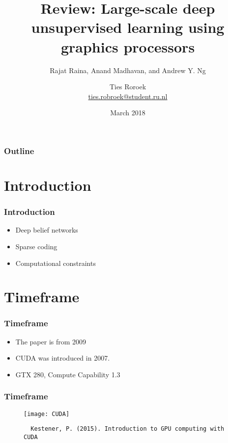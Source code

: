 \documentclass{beamer}
\title[Deep learning using graphics processors]{
  Review: Large-scale deep unsupervised learning using graphics processors}
\subtitle{Rajat Raina, Anand Madhavan, and Andrew Y. Ng}
\author[Ties Robroek]{
  Ties Roroek \\\medskip
  {\small \url{ties.robroek@student.ru.nl}}}
\institute[Radboud University Nijmegen]{
  Institute for Computing and Information Sciences \\
  Radboud University Nijmegen}
\date[March 2018]{
  March 2018}
\begin{document}
\begin{frame}
  \titlepage
\end{frame}

\begin{frame}
  \frametitle{Outline}

  \tableofcontents
\end{frame}

\section{Introduction}

\begin{frame}
  \frametitle{Introduction}

  \begin{itemize}
    \item Deep belief networks
    \item Sparse coding
    \item Computational constraints
  \end{itemize}
\end{frame}

\section{Timeframe}

\begin{frame}
  \frametitle{Timeframe}

  \begin{itemize}
    \item The paper is from 2009
    \item CUDA was introduced in 2007.
    \item GTX 280, Compute Capability 1.3
  \end{itemize}
\end{frame}

\begin{frame}[fragile]
  \frametitle{Timeframe}

  \begin{figure}[h]
  \center
  \texttt{[image: CUDA]}
  {\tiny
  \begin{verbatim}
  Kestener, P. (2015). Introduction to GPU computing with CUDA
  \end{verbatim}
  }
  \end{figure}
\end{frame}
\end{document}
